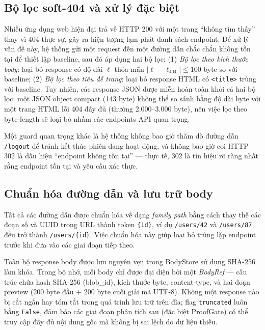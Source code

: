 \subsection{Bộ lọc soft-404 và xử lý đặc biệt}

Nhiều ứng dụng web hiện đại trả về HTTP 200 với một trang ``không tìm thấy'' thay vì 404 thực sự, gây ra hiện tượng lạm phát danh sách endpoint. Để xử lý vấn đề này, hệ thống gửi một request đến một đường dẫn chắc chắn không tồn tại để thiết lập baseline, sau đó áp dụng hai bộ lọc: (1) \textit{Bộ lọc theo kích thước body}: loại bỏ response có độ dài $\ell$ thỏa mãn $|\ell - \ell_{404}| \leq 100$ byte so với baseline; (2) \textit{Bộ lọc theo tiêu đề trang}: loại bỏ response HTML có \texttt{<title>} trùng với baseline. Tuy nhiên, các response JSON được miễn hoàn toàn khỏi cả hai bộ lọc: một JSON object compact (143 byte) không thể so sánh bằng độ dài byte với một trang HTML lỗi 404 đầy đủ (thường 2.000--3.000 byte), nên việc lọc theo byte-length sẽ loại bỏ nhầm các endpoints API quan trọng.

Một guard quan trọng khác là hệ thống không bao giờ thăm dò đường dẫn \texttt{/logout} để tránh kết thúc phiên đang hoạt động, và không bao giờ coi HTTP 302 là dấu hiệu ``endpoint không tồn tại'' --- thực tế, 302 là tín hiệu rõ ràng nhất rằng endpoint tồn tại và yêu cầu xác thực.

\subsection{Chuẩn hóa đường dẫn và lưu trữ body}

Tất cả các đường dẫn được chuẩn hóa về dạng \textit{family path} bằng cách thay thế các đoạn số và UUID trong URL thành token \texttt{\{id\}}, ví dụ \texttt{/users/42} và \texttt{/users/87} đều trở thành \texttt{/users/\{id\}}. Việc chuẩn hóa này giúp loại bỏ trùng lặp endpoint trước khi đưa vào các giai đoạn tiếp theo.

Toàn bộ response body được lưu nguyên vẹn trong BodyStore sử dụng SHA-256 làm khóa. Trong bộ nhớ, mỗi body chỉ được đại diện bởi một \textit{BodyRef} --- cấu trúc chứa hash SHA-256 (blob\_id), kích thước byte, content-type, và hai đoạn preview (200 byte đầu + 200 byte cuối giải mã UTF-8). Không một response nào bị cắt ngắn hay tóm tắt trong quá trình lưu trữ trên đĩa; flag \texttt{truncated} luôn bằng \texttt{False}, đảm bảo các giai đoạn phân tích sau (đặc biệt ProofGate) có thể truy cập đầy đủ nội dung gốc mà không bị sai lệch do dữ liệu thiếu.

